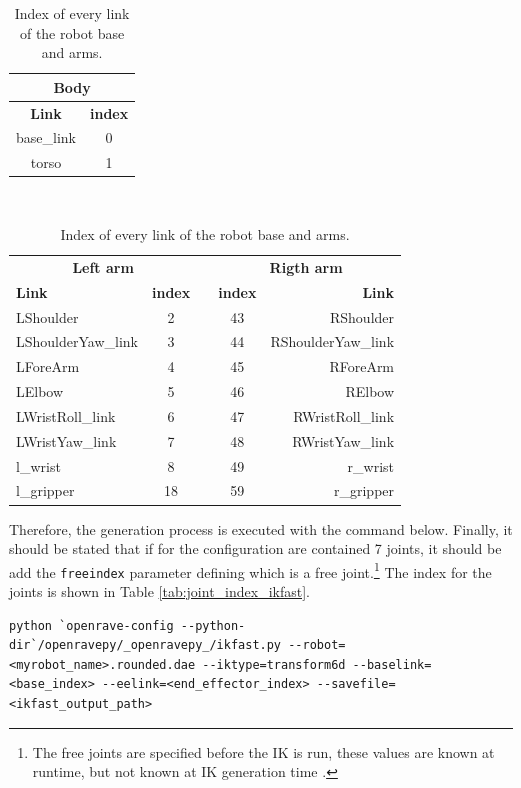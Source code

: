 \documentclass[12pt,a4paper,final,twoside,openright]{report}
\begin{document}
\begin{table}[!h]
\begin{center}
\begin{tabular}{|c|c|}
\hline
\multicolumn{2}{|c|}{\textbf{Body}} \\ \hline
\textbf{Link} & \textbf{index} \\ \hline
base\_link & 0 \\
torso & 1 \\
\end{tabular}
\\
\begin{tabular}{|l|c|c|c|r|}
\hline
\multicolumn{2}{|c|}{\textbf{Left arm}} & & \multicolumn{2}{|c|}{\textbf{Rigth arm}} \\ \cline{1-2}\cline{4-5}
\textbf{Link} & \textbf{index} & & \textbf{index} & \textbf{Link} \\ \cline{1-2}\cline{4-5}
LShoulder & 2 & & 43 & RShoulder \\
LShoulderYaw\_link & 3 & & 44 & RShoulderYaw\_link \\
LForeArm & 4 & & 45 & RForeArm \\
LElbow & 5 & & 46 & RElbow \\                            
LWristRoll\_link & 6 & & 47 & RWristRoll\_link \\                   
LWristYaw\_link & 7 & & 48 & RWristYaw\_link \\ \cline{1-2}\cline{4-5}
l\_wrist & 8 & & 49 & r\_wrist \\
l\_gripper & 18 & & 59 & r\_gripper \\ \hline
\end{tabular}
\caption{Index of every link of the robot base and arms.\label{tab:link_index_ikfast}}
\end{center}
\end{table}

Therefore, the generation process is executed with the command below. Finally, it should be stated that if for the configuration are contained 7 joints, it should be add the \texttt{freeindex} parameter defining which is a free joint.\footnote{The free joints are specified before the IK is run, these values are known at runtime, but not known at IK generation time \citep{Diankov2010}.} The index for the joints is shown in Table \ref{tab:joint_index_ikfast}.

\begin{lstlisting}
python `openrave-config --python-dir`/openravepy/_openravepy_/ikfast.py --robot=<myrobot_name>.rounded.dae --iktype=transform6d --baselink=<base_index> --eelink=<end_effector_index> --savefile=<ikfast_output_path>
\end{lstlisting}
\end{document}

